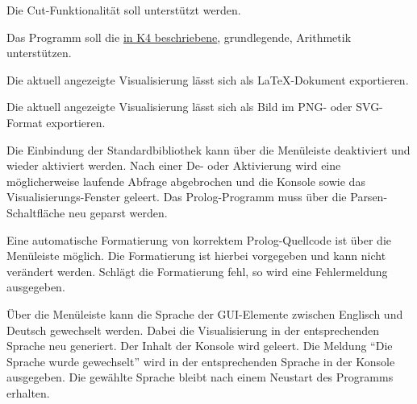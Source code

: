 \documentclass[parskip=full,11pt,twoside]{scrartcl}
\begin{document}

Die Cut-Funktionalität soll unterstützt werden.


Das Programm soll die \hyperref[crt:maths]{in K4 beschriebene}, grundlegende, Arithmetik unterstützen.


Die aktuell angezeigte Visualisierung lässt sich als LaTeX-Dokument exportieren.


Die aktuell angezeigte Visualisierung lässt sich als Bild im PNG- oder SVG-Format exportieren.

\newpage
{}

Die Einbindung der Standardbibliothek kann über die Menüleiste deaktiviert und wieder aktiviert werden. Nach einer De- oder Aktivierung wird eine möglicherweise laufende Abfrage abgebrochen und die Konsole sowie das Visualisierungs-Fenster geleert. Das Prolog-Programm muss über die Parsen-Schaltfläche neu geparst werden.


Eine automatische Formatierung von korrektem Prolog-Quellcode ist über die Menüleiste möglich. Die Formatierung ist hierbei vorgegeben und kann nicht verändert werden. Schlägt die Formatierung fehl, so wird eine Fehlermeldung ausgegeben.


Über die Menüleiste kann die Sprache der GUI-Elemente zwischen Englisch und Deutsch gewechselt werden. Dabei die Visualisierung in der entsprechenden Sprache neu generiert. Der Inhalt der Konsole wird geleert. Die Meldung \enquote{Die Sprache wurde gewechselt} wird in der entsprechenden Sprache in der Konsole ausgegeben. Die gewählte Sprache bleibt nach einem Neustart des Programms erhalten.

\end{document}
